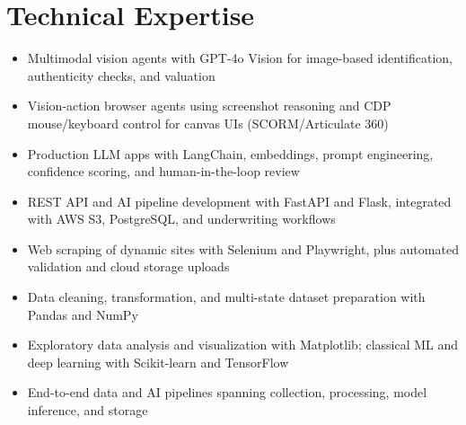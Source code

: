 \documentclass[letterpaper,10pt]{article}
\newcommand{\resumeItem}[1]{
  \item\small{
    {#1 \vspace{-2pt}}
  }
}
\newcommand{\resumeItemListStart}{\begin{itemize}}
\newcommand{\resumeItemListEnd}{\end{itemize}\vspace{-5pt}}
\begin{document}
\section{Technical Expertise}
  \resumeItemListStart
    \resumeItem{Multimodal vision agents with GPT-4o Vision for image-based identification, authenticity checks, and valuation}
    \resumeItem{Vision-action browser agents using screenshot reasoning and CDP mouse/keyboard control for canvas UIs (SCORM/Articulate 360)}
    \resumeItem{Production LLM apps with LangChain, embeddings, prompt engineering, confidence scoring, and human-in-the-loop review}
    \resumeItem{REST API and AI pipeline development with FastAPI and Flask, integrated with AWS S3, PostgreSQL, and underwriting workflows}
    \resumeItem{Web scraping of dynamic sites with Selenium and Playwright, plus automated validation and cloud storage uploads}
    \resumeItem{Data cleaning, transformation, and multi-state dataset preparation with Pandas and NumPy}
    \resumeItem{Exploratory data analysis and visualization with Matplotlib; classical ML and deep learning with Scikit-learn and TensorFlow}
    \resumeItem{End-to-end data and AI pipelines spanning collection, processing, model inference, and storage}
  \resumeItemListEnd

\end{document}
